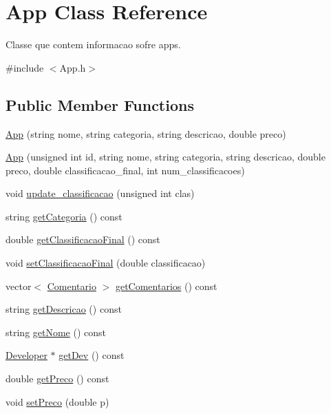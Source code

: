 \hypertarget{class_app}{\section{App Class Reference}
\label{class_app}
}


Classe que contem informacao sofre apps.  




{\ttfamily \#include $<$App.\+h$>$}

\subsection*{Public Member Functions}
\begin{DoxyCompactItemize}
\item 
\hyperlink{class_app_ae491b91a0a622aa5f78559403b83e0df}{App} (string nome, string categoria, string descricao, double preco)
\item 
\hyperlink{class_app_a77f4deed2edae59b74f5aca757c1368a}{App} (unsigned int id, string nome, string categoria, string descricao, double preco, double classificacao\+\_\+final, int num\+\_\+classificacoes)
\item 
void \hyperlink{class_app_ac720715c2e11bfc218842141b9c6e0d2}{update\+\_\+classificacao} (unsigned int clas)
\item 
string \hyperlink{class_app_a58076d5e40336d8f1489f49ebcc648ac}{get\+Categoria} () const 
\item 
double \hyperlink{class_app_a99b0df2b556e0d0967af13f37b47178e}{get\+Classificacao\+Final} () const 
\item 
void \hyperlink{class_app_a5b0357aee7ee3722ab97efca5c88a07b}{set\+Classificacao\+Final} (double classificacao)
\item 
vector$<$ \hyperlink{class_comentario}{Comentario} $>$ \hyperlink{class_app_a55940da54fefa49300678f6ce87eeb04}{get\+Comentarios} () const 
\item 
string \hyperlink{class_app_a2dcf86011e3b1e8dc8d027f4b4b4b253}{get\+Descricao} () const 
\item 
string \hyperlink{class_app_a7b94ca7878eb536a1d1b1448c2072bea}{get\+Nome} () const 
\item 
\hyperlink{class_developer}{Developer} $\ast$ \hyperlink{class_app_a94de3c0569d8c300a634c5e058da70da}{get\+Dev} () const 
\item 
double \hyperlink{class_app_a203cc8ebea02cf4cabb736c3c4e8bc51}{get\+Preco} () const 
\item 
void \hyperlink{class_app_ab9723a9ef1383d41b9960e07de4c5691}{set\+Preco} (double p)

\end{DoxyCompactItemize}
